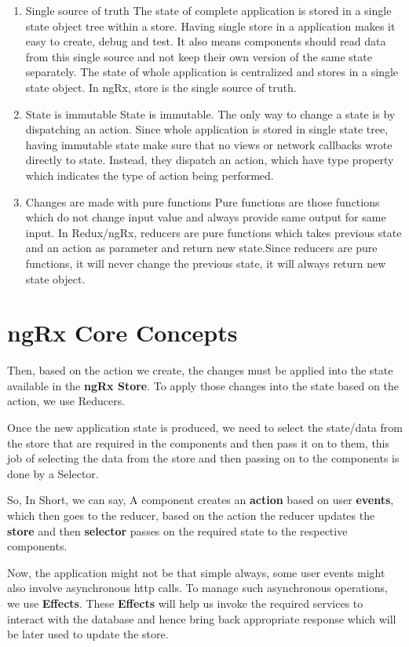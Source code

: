 \documentclass{report}
\begin{document}
\begin{enumerate}
	\item{Single source of truth}
		The state of complete application is stored in a single state object tree within a store. Having single store in a application makes it easy to create, debug and test. It also means components should read data from this single source and not keep their own version of the same state separately. The state of whole application is centralized and stores in a single state object. In ngRx, store is the single source of truth.
	\item{ State is immutable}
		State is immutable. The only way to change a state is by dispatching an action. Since whole application is stored in single state tree, having immutable state make sure that no views or network callbacks wrote directly to state. Instead, they dispatch an action, which have type property which indicates the  type of action being performed.
	\item{Changes are made with pure functions}
		Pure functions are those functions which do not change input value and always provide same output for same input. In Redux/ngRx, reducers are pure functions which takes previous state and an action as parameter and return new state.Since reducers are pure functions, it will never change the previous state, it will always return new state object.
\end{enumerate}
\section{ngRx Core Concepts}
Then, based on the action we create, the changes must be applied into the state available in the \textbf{ngRx Store}. To apply those changes into the state based on the action, we use Reducers.

Once the new application state is produced, we need to select the state/data from the store that are required in the components and then pass it on to them, this job of selecting the data from the store and then passing on to the components is done by a Selector.

So, In Short, we can say, A component creates an \textbf{action} based on user \textbf{events}, which then goes to the reducer, based on the action the reducer updates the \textbf{store} and then \textbf{selector} passes on the required state to the respective components.

Now, the application might not be that simple always, some user events might also involve asynchronous http calls. To manage such asynchronous operations, we use \textbf{Effects}. These \textbf{Effects} will help us invoke the required services to interact with the database and hence bring back appropriate response which will be later used to update the store.
\end{document}
